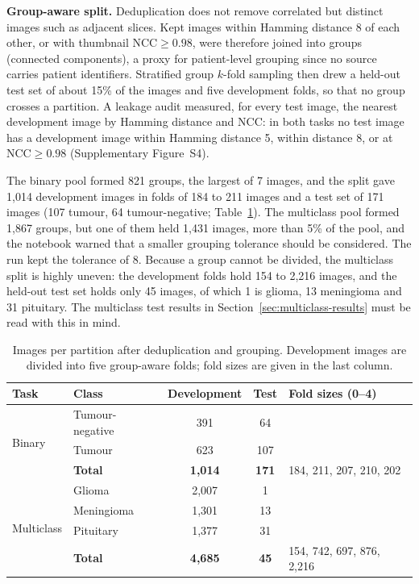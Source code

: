 \documentclass[final,3p,times,number]{elsarticle}
\begin{document}
\textbf{Group-aware split.} Deduplication does not remove correlated but distinct images such as adjacent slices. Kept images within Hamming distance 8 of each other, or with thumbnail $\mathrm{NCC}\geq 0.98$, were therefore joined into groups (connected components), a proxy for patient-level grouping since no source carries patient identifiers. Stratified group $k$-fold sampling then drew a held-out test set of about 15\% of the images and five development folds, so that no group crosses a partition. A leakage audit measured, for every test image, the nearest development image by Hamming distance and NCC: in both tasks no test image has a development image within Hamming distance 5, within distance 8, or at $\mathrm{NCC}\geq 0.98$ (Supplementary Figure~S4).

The binary pool formed 821 groups, the largest of 7 images, and the split gave 1,014 development images in folds of 184 to 211 images and a test set of 171 images (107 tumour, 64 tumour-negative; Table~\ref{tab:splits}). The multiclass pool formed 1,867 groups, but one of them held 1,431 images, more than 5\% of the pool, and the notebook warned that a smaller grouping tolerance should be considered. The run kept the tolerance of 8. Because a group cannot be divided, the multiclass split is highly uneven: the development folds hold 154 to 2,216 images, and the held-out test set holds only 45 images, of which 1 is glioma, 13 meningioma and 31 pituitary. The multiclass test results in Section~\ref{sec:multiclass-results} must be read with this in mind.

\begin{table}[htbp]
\centering
\caption{Images per partition after deduplication and grouping. Development images are divided into five group-aware folds; fold sizes are given in the last column.}
\label{tab:splits}
\small
\begin{tabular*}{\textwidth}{@{\extracolsep{\fill}}llccl@{}}
\toprule
Task & Class & Development & Test & Fold sizes (0--4) \\
\midrule
\multirow{3}{*}{Binary} & Tumour-negative & 391 & 64 & \\
 & Tumour & 623 & 107 & \\
 & \textbf{Total} & \textbf{1,014} & \textbf{171} & 184, 211, 207, 210, 202 \\
\midrule
\multirow{4}{*}{Multiclass} & Glioma & 2,007 & 1 & \\
 & Meningioma & 1,301 & 13 & \\
 & Pituitary & 1,377 & 31 & \\
 & \textbf{Total} & \textbf{4,685} & \textbf{45} & 154, 742, 697, 876, 2,216 \\
\bottomrule
\end{tabular*}
\end{table}
\end{document}
